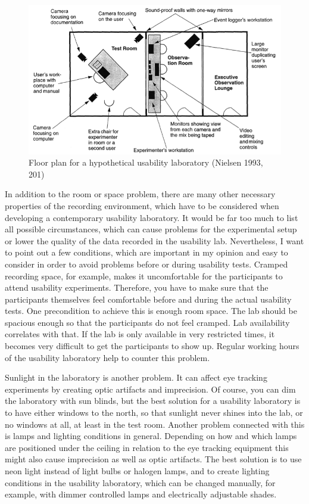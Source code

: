 \documentclass[output=paper]{langsci/langscibook}
\begin{document}
\begin{figure}
 \includegraphics[width=\textwidth]{figures/Roesener6.png}
 \caption{Floor plan for a hypothetical usability laboratory (Nielsen 1993, 201)}
 \label{fig:6}
\end{figure} 


In addition to the room or space problem, there are many other necessary properties of the recording environment, which have to be considered when developing a contemporary usability laboratory. It would be far too much to list all possible circumstances, which can cause problems for the experimental setup or lower the quality of the data recorded in the usability lab. Nevertheless, I want to point out a few conditions, which are important in my opinion and easy to consider in order to avoid problems before or during usability tests. Cramped recording space, for example, makes it uncomfortable for the participants to attend usability experiments. Therefore, you have to make sure that the participants themselves feel comfortable before and during the actual usability tests. One precondition to achieve this is enough room space. The lab should be spacious enough so that the participants do not feel cramped. Lab availability correlates with that. If the lab is only available in very restricted times, it becomes very difficult to get the participants to show up. Regular working hours of the usability laboratory help to counter this problem.


 Sunlight in the laboratory is another problem. It can affect eye tracking experiments by creating optic artifacts and imprecision. Of course, you can dim the laboratory with sun blinds, but the best solution for a usability laboratory is to have either windows to the north, so that sunlight never shines into the lab, or no windows at all, at least in the test room. Another problem connected with this is lamps and lighting conditions in general. Depending on how and which lamps are positioned under the ceiling in relation to the eye tracking equipment this might also cause imprecision as well as optic artifacts. The best solution is to use neon light instead of light bulbs or halogen lamps, and to create lighting conditions in the usability laboratory, which can be changed manually, for example, with dimmer controlled lamps and electrically adjustable shades.
\end{document}
